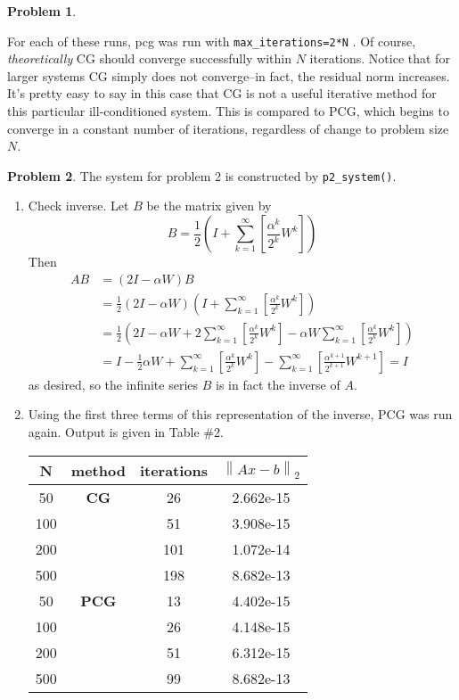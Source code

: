 \documentclass[10pt]{article}
\theoremstyle{definition}
\newtheorem{prob}{Problem}
\newcommand{\norm}[1]{\left\lVert#1\right\rVert}
\begin{document}
\begin{prob}
\begin{enumerate}[\bfseries(a)]
	For each of these runs, pcg was run with \verb;max_iterations=2*N; .
	Of course, \textit{theoretically} CG should converge successfully within $N$
	iterations. Notice that for larger systems CG simply does not converge--in fact,
	the residual norm increases. It's pretty easy to say in this case that CG is
	not a useful iterative method for this particular ill-conditioned system. This is compared to PCG, which begins to converge in a constant number of iterations, regardless of change to problem size $N$.
\end{enumerate}
\end{prob}
\begin{prob}
The system for problem 2 is constructed by \texttt{p2\_system()}.
\begin{enumerate}[\bfseries(a)]
\item Check inverse. Let $B$ be the matrix given by
\[
B = \frac{1}{2}\left( I + \sum_{k=1}^{\infty}\left[\frac{\alpha^k}{2^k} W^k\right]
\right)
\]
Then
\begin{align*}
	AB  &= \left(2I - \alpha W\right)B \\
	&= \frac{1}{2} \left(2I - \alpha W\right)\left( I + \sum_{k=1}^{\infty}\left[\frac{\alpha^k}{2^k} W^k\right]
	\right)\\
	&= \frac{1}{2} \left(2I - \alpha W + 2\sum_{k=1}^{\infty}\left[\frac{\alpha^k}{2^k} W^k\right]
	- \alpha W \sum_{k=1}^{\infty}\left[\frac{\alpha^k}{2^k} W^k\right]
		\right)\\
	&= I - \frac{1}{2}\alpha W
		+ \sum_{k=1}^{\infty}\left[\frac{\alpha^k}{2^k} W^k\right]
		- \sum_{k=1}^{\infty}\left[\frac{\alpha^{k+1}}{2^{k+1}} W^{k+1}\right] =  I
\end{align*}
as desired, so the infinite series $B$ is in fact the inverse of $A$.
\item
Using the first three terms of this representation of the inverse, PCG was run again. Output is given in Table \#2.
        \begin{table}[h]
        \begin{center}
       \begin{tabular}{|c|c|c|c|}

       N & method & iterations & $\norm{Ax-b}_2$ \\
       \hline
50& \textbf{CG} &26 &2.662e-15 \\ \hline
100 & & 51& 3.908e-15 \\ \hline
200& & 101 &1.072e-14\\ \hline
500&  &198& 8.682e-13\\ \hline
50& \textbf{PCG}&13&4.402e-15\\ \hline
100& &26 &4.148e-15\\ \hline
200& & 51& 6.312e-15\\ \hline
500& & 99& 8.682e-13\\ \hline


\end{tabular}
\end{center}
\end{table}
\end{enumerate}
\end{prob}
\end{document}
